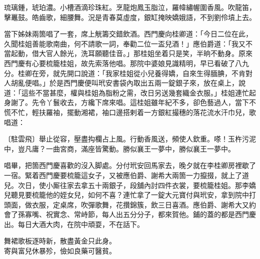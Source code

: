 \begin{myquote}
琉璃鍾，琥珀濃。小槽酒滴珍珠紅。烹龍炮鳳玉脂泣，羅幃繡幄圍香風。吹龍笛，擊鼉鼓。皓齒歌，細腰舞。況是青春莫虛度，銀缸掩映嬌娥語，不到劉伶墳上去。
\end{myquote}

當下姊妹兩箇唱了一套，席上觥籌交錯飲酒。西門慶向桂卿道：「今日二位在此，久聞桂姐善能歌南曲，何不請歌一詞，奉勸二位一盃兒酒！」應伯爵道：「我又不當起動，借大官人餘光，洗耳願聽佳音。」那桂姐坐着只是笑，半晌不動身。原來西門慶有心要梳籠桂姐，故先索落他唱。那院中婆娘見識精明，早已看破了八九分。桂卿在旁，就先開口說道：「我家桂姐從小兒養得嬌，自來生得腼腆，不肯對人胡亂便唱。」於是西門慶便叫玳安書袋內取出五兩一錠銀子來，放在桌上，說道：「這些不當甚麼，權與桂姐為脂粉之需，改日另送幾套織金衣服。」桂姐連忙起身謝了。{}先令丫鬟收去，方纔下席來唱。這桂姐雖年紀不多，卻色藝過人，當下不慌不忙，輕扶羅袖，擺動湘裙，袖口邊搭剌着一方銀紅撮穗的落花流水汗巾兒，{}歌唱道：

\begin{myquote}
{\markfont\small〔駐雲飛〕}舉止從容，壓盡抅欄占上風。行動香風送，頻使人欽重。嗏！玉杵污泥中，豈凡庸？一曲宮商，滿座皆驚動。勝似襄王一夢中，勝似襄王一夢中。
\end{myquote}

唱畢，把箇西門慶喜歡的沒入脚處。分付玳安回馬家去，晚夕就在李桂卿房裡歇了一宿。緊着西門慶要梳籠這女子，又被應伯爵、謝希大兩箇一力攛掇，就上了道兒。次日，使小厮往家去拿五十兩銀子，段舖內討四件衣裳，要梳籠桂姐。那李嬌兒聽見要梳籠他的姪女兒，{}如何不喜？連忙拿了一錠大元寶付與玳安，拿到院中打頭面，做衣服，定桌席，吹彈歌舞，花攢錦簇，飲三日喜酒。應伯爵、謝希大又約會了孫寡嘴、祝實念、常峙節，每人出五分分子，都來賀他。鋪的蓋的都是西門慶出。每日大酒大肉，在院中頑耍，不在話下。

\begin{myquote}
舞裙歌板逐時新，散盡黃金只此身。\\寄與富兒休暴殄，儉如良藥可醫貧。
\end{myquote}

